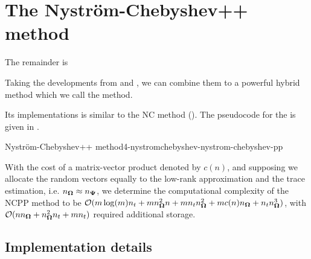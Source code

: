 
\section{The Nystr\"om-Chebyshev++ method}
\label{sec:4-nystromchebyshev-nystromchebyshev-pp}

The remainder is 

Taking the developments from  and ,
we can combine them to a powerful hybrid method which we call the 
method.


Its implementations is similar to the \gls{NC} method ().
The pseudocode for the  is given in .

\begin{algo}{Nystr\"om-Chebyshev++ method}{4-nystromchebyshev-nystrom-chebyshev-pp}
    
\end{algo}

With the cost of a matrix-vector product denoted by
$c(n)$, and supposing we allocate the random vectors equally
to the low-rank approximation and the trace estimation, i.e. $n_{\boldsymbol{\Omega}} \approx n_{\boldsymbol{\Psi}}$,
we determine the computational complexity of the \gls{NCPP}
method to be $\mathcal{O}(m \log(m) n_t + m n_{\boldsymbol{\Omega}}^2 n + m n_t n_{\boldsymbol{\Omega}}^2 +  m c(n) n_{\boldsymbol{\Omega}} + n_t n_{\boldsymbol{\Omega}}^3)$, with
$\mathcal{O}(n n_{\boldsymbol{\Omega}} + n_{\boldsymbol{\Omega}}^2 n_t + m n_t)$ required additional storage.\\


\subsection{Implementation details}
\label{subsec:4-nystromchebyshev-implementation-details}


